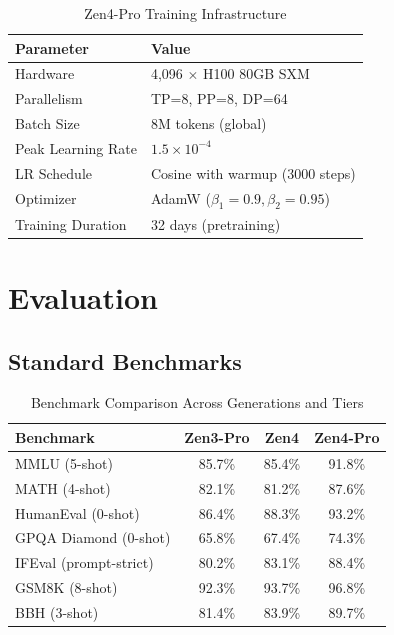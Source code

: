 \documentclass[11pt,a4paper]{article}
\begin{document}
\begin{table}[H]
\centering
\begin{tabular}{ll}
\toprule
\textbf{Parameter} & \textbf{Value} \\
\midrule
Hardware           & 4,096 $\times$ H100 80GB SXM \\
Parallelism        & TP=8, PP=8, DP=64 \\
Batch Size         & 8M tokens (global) \\
Peak Learning Rate & $1.5 \times 10^{-4}$ \\
LR Schedule        & Cosine with warmup (3000 steps) \\
Optimizer          & AdamW ($\beta_1=0.9, \beta_2=0.95$) \\
Training Duration  & 32 days (pretraining) \\
\bottomrule
\end{tabular}
\caption{Zen4-Pro Training Infrastructure}
\end{table}

\section{Evaluation}

\subsection{Standard Benchmarks}

\begin{table}[H]
\centering
\begin{tabular}{lccc}
\toprule
\textbf{Benchmark} & \textbf{Zen3-Pro} & \textbf{Zen4} & \textbf{Zen4-Pro} \\
\midrule
MMLU (5-shot)            & 85.7\% & 85.4\% & 91.8\% \\
MATH (4-shot)            & 82.1\% & 81.2\% & 87.6\% \\
HumanEval (0-shot)       & 86.4\% & 88.3\% & 93.2\% \\
GPQA Diamond (0-shot)    & 65.8\% & 67.4\% & 74.3\% \\
IFEval (prompt-strict)   & 80.2\% & 83.1\% & 88.4\% \\
GSM8K (8-shot)           & 92.3\% & 93.7\% & 96.8\% \\
BBH (3-shot)             & 81.4\% & 83.9\% & 89.7\% \\
\bottomrule
\end{tabular}
\caption{Benchmark Comparison Across Generations and Tiers}
\end{table}
\end{document}
